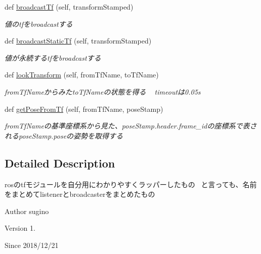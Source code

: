\begin{DoxyCompactItemize}
\item 
def \hyperlink{classmsTfGetter_1_1tfGetter_a2197923dada642c3d44df94990503e9a}{broadcast\+Tf} (self, transform\+Stamped)
\begin{DoxyCompactList}\small\item\em 値のtfをbroadcastする \end{DoxyCompactList}\item 
def \hyperlink{classmsTfGetter_1_1tfGetter_a82484ce686977bd9e1d3ffa2e3de5aee}{broadcast\+Static\+Tf} (self, transform\+Stamped)
\begin{DoxyCompactList}\small\item\em 値が永続するtfをbroadcastする \end{DoxyCompactList}\item 
def \hyperlink{classmsTfGetter_1_1tfGetter_aadb0e5d08e8c080fed67e1f7afe26931}{look\+Transform} (self, from\+Tf\+Name, to\+Tf\+Name)
\begin{DoxyCompactList}\small\item\em from\+Tf\+Nameからみたto\+Tf\+Nameの状態を得る ~\newline
 timeoutは0.05s \end{DoxyCompactList}\item 
def \hyperlink{classmsTfGetter_1_1tfGetter_a170eb4a51944de61b2bfecff14df4a9a}{get\+Pose\+From\+Tf} (self, from\+Tf\+Name, pose\+Stamp)
\begin{DoxyCompactList}\small\item\em from\+Tf\+Nameの基準座標系から見た、pose\+Stamp.\+header.\+frame\+\_\+idの座標系で表されるpose\+Stamp.\+poseの姿勢を取得する \end{DoxyCompactList}\end{DoxyCompactItemize}


\subsection{Detailed Description}
rosのtfモジュールを自分用にわかりやすくラッパーしたもの~\newline
 と言っても、名前をまとめてlistenerとbroadcasterをまとめたもの 

\begin{DoxyAuthor}{Author}
sugino 
\end{DoxyAuthor}
\begin{DoxyVersion}{Version}
1. 
\end{DoxyVersion}
\begin{DoxySince}{Since}
2018/12/21 
\end{DoxySince}


